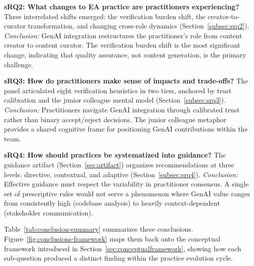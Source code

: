 \textbf{sRQ2: What changes to EA practice are practitioners experiencing?}
Three interrelated shifts emerged: the verification burden shift, the
creator-to-curator transformation, and changing cross-role dynamics
(Section~\ref{subsec:srq2}). \textit{Conclusion:} GenAI integration
restructures the practitioner's role from content creator to content curator.
The verification burden shift is the most significant change, indicating that
quality assurance, not content generation, is the primary challenge.

\textbf{sRQ3: How do practitioners make sense of impacts and trade-offs?}
The panel articulated eight verification heuristics in two tiers, anchored by
trust calibration and the junior colleague mental model
(Section~\ref{subsec:srq3}). \textit{Conclusion:} Practitioners navigate
GenAI integration through calibrated trust rather than binary accept/reject
decisions. The junior colleague metaphor provides a shared cognitive frame
for positioning GenAI contributions within the team.

\textbf{sRQ4: How should practices be systematized into guidance?}
The guidance artifact (Section~\ref{sec:artifact}) organizes recommendations
at three levels: directive, contextual, and adaptive
(Section~\ref{subsec:srq4}). \textit{Conclusion:} Effective guidance must
respect the variability in practitioner consensus. A single set of
prescriptive rules would not serve a phenomenon where GenAI value ranges from
consistently high (codebase analysis) to heavily context-dependent
(stakeholder communication).

Table~\ref{tab:conclusion-summary} summarizes these conclusions.
Figure~\ref{fig:conclusions-framework} maps them back onto the conceptual
framework introduced in Section~\ref{sec:conceptualframework}, showing how each
sub-question produced a distinct finding within the practice evolution cycle.

